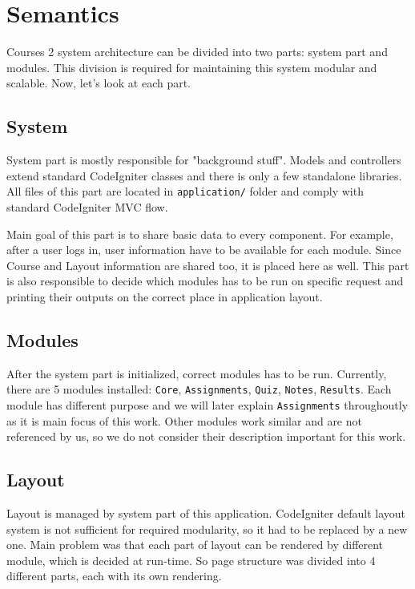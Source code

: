 \section{Semantics}

Courses 2 system architecture can be divided into two parts: system part and modules. This division is required for maintaining this system modular and scalable. Now, let's look at each part.

\subsection{System}

System part is mostly responsible for "background stuff". Models and controllers extend standard CodeIgniter classes and there is only a few standalone libraries. All files of this part are located in \texttt{application/} folder and comply with standard CodeIgniter MVC flow.


Main goal of this part is to share basic data to every component. For example, after a user logs in, user information have to be available for each module. Since Course and Layout information are shared too, it is placed here as well. This part is also responsible to decide which modules has to be run on specific request and printing their outputs on the correct place in application layout.

\subsection{Modules}

After the system part is initialized, correct modules has to be run. Currently, there are 5 modules installed: \texttt{Core}, \texttt{Assignments}, \texttt{Quiz}, \texttt{Notes}, \texttt{Results}. Each module has different purpose and we will later explain \texttt{Assignments} throughoutly as it is main focus of this work. Other modules work similar and are not referenced by us, so we do not consider their description important for this work.

\subsection{Layout}

Layout is managed by system part of this application. CodeIgniter default layout system is not sufficient for required modularity, so it had to be replaced by a new one. Main problem was that each part of layout can be rendered by different module, which is decided at run-time. So page structure was divided into 4 different parts, each with its own rendering.


